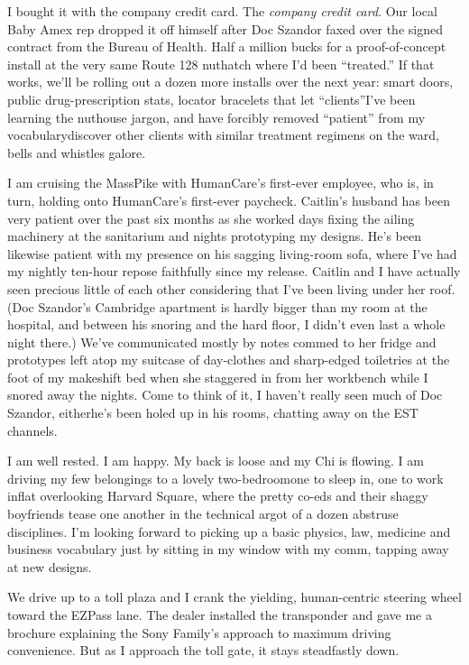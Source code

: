 I bought it with the company credit card. The
\emph{company credit card}. Our local Baby Amex rep dropped it off
himself after Doc Szandor faxed over the signed contract from the
Bureau of Health. Half a million bucks for a proof-of-concept
install at the very same Route 128 nuthatch where I’d been
“treated.” If that works, we’ll be rolling out a dozen more
installs over the next year: smart doors, public drug-prescription
stats, locator bracelets that let “clients”{\dash}I’ve been learning the
nuthouse jargon, and have forcibly removed “patient” from my
vocabulary{\dash}discover other clients with similar treatment regimens
on the ward, bells and whistles galore.

I am cruising the MassPike with HumanCare’s first-ever employee,
who is, in turn, holding onto HumanCare’s first-ever paycheck.
Caitlin’s husband has been very patient over the past six months as
she worked days fixing the ailing machinery at the sanitarium and
nights prototyping my designs. He’s been likewise patient with my
presence on his sagging living-room sofa, where I’ve had my nightly
ten-hour repose faithfully since my release. Caitlin and I have
actually seen precious little of each other considering that I’ve
been living under her roof. (Doc Szandor’s Cambridge apartment is
hardly bigger than my room at the hospital, and between his snoring
and the hard floor, I didn’t even last a whole night there.) We’ve
communicated mostly by notes commed to her fridge and prototypes
left atop my suitcase of day-clothes and sharp-edged toiletries at
the foot of my makeshift bed when she staggered in from her
workbench while I snored away the nights. Come to think of it, I
haven’t really seen much of Doc Szandor, either{\dash}he’s been holed up
in his rooms, chatting away on the EST channels.

I am well rested. I am happy. My back is loose and my Chi is
flowing. I am driving my few belongings to a lovely two-bedroom{\dash}one
to sleep in, one to work in{\dash}flat overlooking Harvard Square, where
the pretty co-eds and their shaggy boyfriends tease one another in
the technical argot of a dozen abstruse disciplines. I’m looking
forward to picking up a basic physics, law, medicine and business
vocabulary just by sitting in my window with my comm, tapping away
at new designs.

We drive up to a toll plaza and I crank the yielding, human-centric
steering wheel toward the EZPass lane. The dealer installed the
transponder and gave me a brochure explaining the Sony Family’s
approach to maximum driving convenience. But as I approach the toll
gate, it stays steadfastly down.

